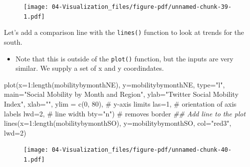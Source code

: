 \documentclass[
  letterpaper,
  DIV=11,
  numbers=noendperiod]{scrreprt}
\newenvironment{Shaded}{\begin{snugshade}}{\end{snugshade}}
\newcommand{\AttributeTok}[1]{\textcolor[rgb]{0.40,0.45,0.13}{#1}}
\newcommand{\CommentTok}[1]{\textcolor[rgb]{0.37,0.37,0.37}{#1}}
\newcommand{\DecValTok}[1]{\textcolor[rgb]{0.68,0.00,0.00}{#1}}
\newcommand{\DocumentationTok}[1]{\textcolor[rgb]{0.37,0.37,0.37}{\textit{#1}}}
\newcommand{\FunctionTok}[1]{\textcolor[rgb]{0.28,0.35,0.67}{#1}}
\newcommand{\NormalTok}[1]{\textcolor[rgb]{0.00,0.23,0.31}{#1}}
\newcommand{\SpecialCharTok}[1]{\textcolor[rgb]{0.37,0.37,0.37}{#1}}
\newcommand{\StringTok}[1]{\textcolor[rgb]{0.13,0.47,0.30}{#1}}
\providecommand{\tightlist}{%
  \setlength{\itemsep}{0pt}\setlength{\parskip}{0pt}}\usepackage{longtable,booktabs,array}
\begin{document}
\begin{figure}[H]

{\centering \texttt{[image: 04-Visualization\_files/figure-pdf/unnamed-chunk-39-1.pdf]}

}

\end{figure}

Let's add a comparison line with the \texttt{lines()} function to look
at trends for the south.

\begin{itemize}
\tightlist
\item
  Note that this is outside of the \texttt{plot()} function, but the
  inputs are very similar. We supply a set of x and y coordindates.
\end{itemize}

\begin{Shaded}
\begin{Highlighting}[]
\FunctionTok{plot}\NormalTok{(}\AttributeTok{x=}\DecValTok{1}\SpecialCharTok{:}\FunctionTok{length}\NormalTok{(mobilitybymonthNE),}
     \AttributeTok{y=}\NormalTok{mobilitybymonthNE,}
     \AttributeTok{type=}\StringTok{"l"}\NormalTok{, }
     \AttributeTok{main=}\StringTok{"Social Mobility by Month and Region"}\NormalTok{,}
     \AttributeTok{ylab=}\StringTok{"Twitter Social Mobility Index"}\NormalTok{,}
     \AttributeTok{xlab=}\StringTok{""}\NormalTok{,}
     \AttributeTok{ylim =} \FunctionTok{c}\NormalTok{(}\DecValTok{0}\NormalTok{, }\DecValTok{80}\NormalTok{), }\CommentTok{\# y{-}axis limits}
     \AttributeTok{las=}\DecValTok{1}\NormalTok{, }\CommentTok{\# orientation of axis labels}
     \AttributeTok{lwd=}\DecValTok{2}\NormalTok{, }\CommentTok{\# line width}
     \AttributeTok{bty=}\StringTok{"n"}\NormalTok{) }\CommentTok{\# removes border}
\DocumentationTok{\#\# Add line to the plot }
\FunctionTok{lines}\NormalTok{(}\AttributeTok{x=}\DecValTok{1}\SpecialCharTok{:}\FunctionTok{length}\NormalTok{(mobilitybymonthSO),}
     \AttributeTok{y=}\NormalTok{mobilitybymonthSO, }\AttributeTok{col=}\StringTok{"red3"}\NormalTok{, }\AttributeTok{lwd=}\DecValTok{2}\NormalTok{)}
\end{Highlighting}
\end{Shaded}

\begin{figure}[H]

{\centering \texttt{[image: 04-Visualization\_files/figure-pdf/unnamed-chunk-40-1.pdf]}

}

\end{figure}
\end{document}
